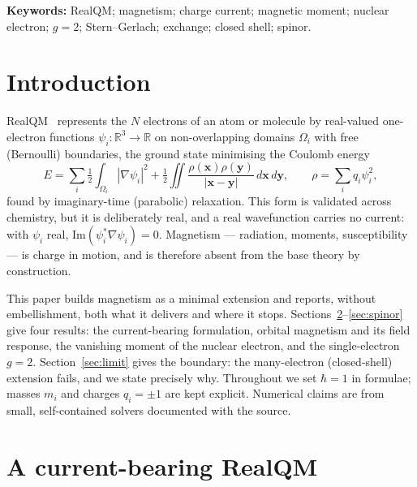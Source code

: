 \documentclass[11pt]{article}
\begin{document}
\medskip
\noindent\textbf{Keywords:} RealQM; magnetism; charge current; magnetic moment; nuclear electron; $g=2$;
Stern--Gerlach; exchange; closed shell; spinor.

\doublespacing

\section{Introduction}
\label{sec:intro}

RealQM~\cite{RealQM} represents the $N$ electrons of an atom or molecule by real-valued one-electron
functions $\psi_i:\mathbb R^3\to\mathbb R$ on non-overlapping domains $\Omega_i$ with free (Bernoulli)
boundaries, the ground state minimising the Coulomb energy
\begin{equation}
E=\sum_i\tfrac12\!\int_{\Omega_i}|\nabla\psi_i|^2
+\tfrac12\!\iint\frac{\rho(\mathbf x)\rho(\mathbf y)}{|\mathbf x-\mathbf y|}\,d\mathbf x\,d\mathbf y,
\qquad \rho=\sum_i q_i\psi_i^2,
\label{eq:E}
\end{equation}
found by imaginary-time (parabolic) relaxation. This form is validated across chemistry, but it is
deliberately real, and a real wavefunction carries no current: with $\psi_i$ real,
$\mathrm{Im}(\psi_i^*\nabla\psi_i)=0$. Magnetism --- radiation, moments, susceptibility --- is charge in
motion, and is therefore absent from the base theory by construction.

This paper builds magnetism as a minimal extension and reports, without embellishment, both what it
delivers and where it stops. Sections~\ref{sec:complex}--\ref{sec:spinor} give four results: the
current-bearing formulation, orbital magnetism and its field response, the vanishing moment of the
nuclear electron, and the single-electron $g=2$. Section~\ref{sec:limit} gives the boundary: the
many-electron (closed-shell) extension fails, and we state precisely why. Throughout we set $\hbar=1$ in
formulae; masses $m_i$ and charges $q_i=\pm1$ are kept explicit. Numerical claims are from small,
self-contained solvers documented with the source.

\section{A current-bearing RealQM}
\label{sec:complex}
\end{document}
